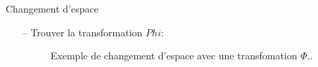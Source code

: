 \documentclass[9pt]{beamer}
\begin{document}
	\begin{frame}{Changement d'espace}
		\begin{itemize}
			\item[--] Trouver la transformation $Phi$:
			\begin{figure}[H]
				{
					\caption{\label{fig::kernel_a_la_mano}  Exemple de changement d'espace avec une transfomation $\Phi$..}
				}
			\end{figure}
		\end{itemize}
	\end{frame}
\end{document}
